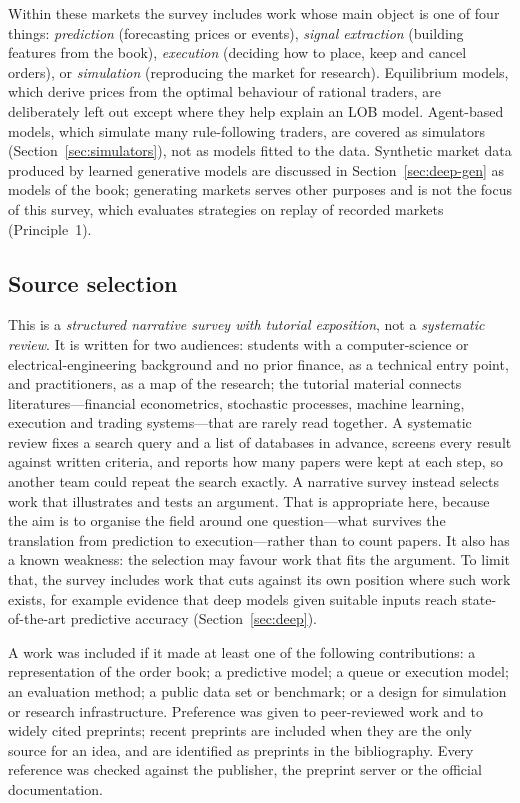 Within these markets the survey includes work whose main object is one of four things:
\emph{prediction} (forecasting prices or events), \emph{signal extraction} (building features from
the book), \emph{execution} (deciding how to place, keep and cancel orders), or \emph{simulation}
(reproducing the market for research). Equilibrium models, which derive prices from the optimal behaviour of
rational traders, are deliberately left out except where they help explain an LOB model. Agent-based models, which
simulate many rule-following traders, are covered as simulators (Section~\ref{sec:simulators}), not as models fitted
to the data. Synthetic market data produced by
learned generative models are discussed in Section~\ref{sec:deep-gen} as models of the book; generating
markets serves other purposes and is not the focus of this survey, which evaluates strategies on replay of
recorded markets (Principle~1).

\subsection{Source selection}

This is a \emph{structured narrative survey with tutorial exposition}, not a \emph{systematic review}. It is
written for two audiences: students with a computer-science or electrical-engineering background and no prior
finance, as a technical entry point, and practitioners, as a map of the research; the tutorial material
connects literatures---financial econometrics, stochastic processes, machine learning, execution and trading
systems---that are rarely read together. A systematic review fixes a
search query and a list of databases in advance, screens every result against written criteria, and
reports how many papers were kept at each step, so another team could repeat the search exactly. A
narrative survey instead selects work that illustrates and tests an argument. That is appropriate
here, because the aim is to organise the field around one question---what survives the translation
from prediction to execution---rather than to count papers. It also has a known weakness: the
selection may favour work that fits the argument. To limit that, the survey includes work that cuts
against its own position where such work exists, for example evidence that deep models given
suitable inputs reach state-of-the-art predictive accuracy (Section~\ref{sec:deep}).

A work was included if it made at least one of the following contributions: a representation of the
order book; a predictive model; a queue or execution model; an evaluation method; a public data set
or benchmark; or a design for simulation or research infrastructure. Preference was given to
peer-reviewed work and to widely cited preprints; recent preprints are included when they are the
only source for an idea, and are identified as preprints in the bibliography. Every reference was
checked against the publisher, the preprint server or the official documentation.

